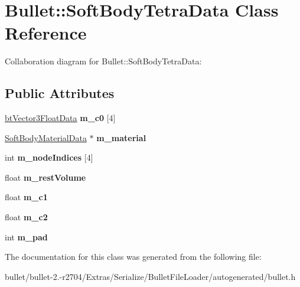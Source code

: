 \hypertarget{class_bullet_1_1_soft_body_tetra_data}{\section{Bullet\+:\+:Soft\+Body\+Tetra\+Data Class Reference}
\label{class_bullet_1_1_soft_body_tetra_data}
}


Collaboration diagram for Bullet\+:\+:Soft\+Body\+Tetra\+Data\+:
\subsection*{Public Attributes}
\begin{DoxyCompactItemize}
\item 
\hypertarget{class_bullet_1_1_soft_body_tetra_data_a49407930f3ebee7e87173b40d1117be4}{\hyperlink{class_bullet_1_1bt_vector3_float_data}{bt\+Vector3\+Float\+Data} {\bfseries m\+\_\+c0} \mbox{[}4\mbox{]}}\label{class_bullet_1_1_soft_body_tetra_data_a49407930f3ebee7e87173b40d1117be4}

\item 
\hypertarget{class_bullet_1_1_soft_body_tetra_data_a92942f885a42c0bd49c2b75f3d78511d}{\hyperlink{class_bullet_1_1_soft_body_material_data}{Soft\+Body\+Material\+Data} $\ast$ {\bfseries m\+\_\+material}}\label{class_bullet_1_1_soft_body_tetra_data_a92942f885a42c0bd49c2b75f3d78511d}

\item 
\hypertarget{class_bullet_1_1_soft_body_tetra_data_a6b368b3f6b9546a987328541e8fc693a}{int {\bfseries m\+\_\+node\+Indices} \mbox{[}4\mbox{]}}\label{class_bullet_1_1_soft_body_tetra_data_a6b368b3f6b9546a987328541e8fc693a}

\item 
\hypertarget{class_bullet_1_1_soft_body_tetra_data_a874bcc72871b70612f7960b484b9f97f}{float {\bfseries m\+\_\+rest\+Volume}}\label{class_bullet_1_1_soft_body_tetra_data_a874bcc72871b70612f7960b484b9f97f}

\item 
\hypertarget{class_bullet_1_1_soft_body_tetra_data_ade456ada473b317df9462c585c768728}{float {\bfseries m\+\_\+c1}}\label{class_bullet_1_1_soft_body_tetra_data_ade456ada473b317df9462c585c768728}

\item 
\hypertarget{class_bullet_1_1_soft_body_tetra_data_a02b997e0191108aeee70a8c59805429e}{float {\bfseries m\+\_\+c2}}\label{class_bullet_1_1_soft_body_tetra_data_a02b997e0191108aeee70a8c59805429e}

\item 
\hypertarget{class_bullet_1_1_soft_body_tetra_data_a870337de48e7550c0d9abfb3a4f3fce0}{int {\bfseries m\+\_\+pad}}\label{class_bullet_1_1_soft_body_tetra_data_a870337de48e7550c0d9abfb3a4f3fce0}

\end{DoxyCompactItemize}


The documentation for this class was generated from the following file\+:\begin{DoxyCompactItemize}
\item 
bullet/bullet-\/2.-\/r2704/\+Extras/\+Serialize/\+Bullet\+File\+Loader/autogenerated/bullet.\+h\end{DoxyCompactItemize}
